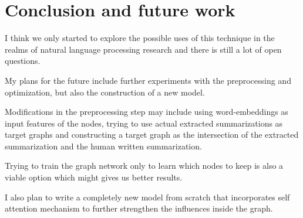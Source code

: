 \chapter{Conclusion and future work}\label{sect:Future}
I think we only started to explore the possible uses of this technique in the realms of natural language processing research and there is still a lot of open questions.

My plans for the future include further experiments with the preprocessing and optimization, but also the construction of a new model.

Modifications in the preprocessing step may include using word-embeddings as input features of the nodes, trying to use actual extracted summarizations as target graphs and constructing a target graph as the intersection of the extracted summarization and the human written summarization.

Trying to train the graph network only to learn which nodes to keep is also a viable option which might gives us better results.

I also plan to write a completely new model from scratch that incorporates self attention mechanism to further strengthen the influences inside the graph.